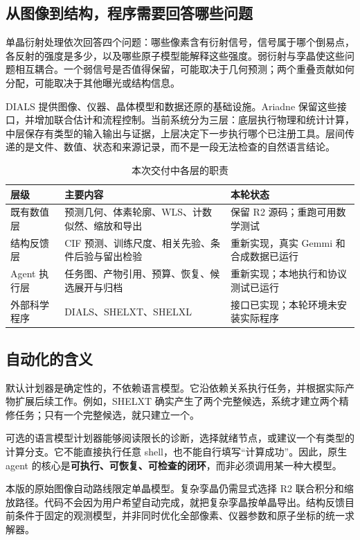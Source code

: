 \documentclass[UTF8,11pt,a4paper,fontset=fandol]{ctexart}
\begin{document}
\subsection{从图像到结构，程序需要回答哪些问题}

单晶衍射处理依次回答四个问题：哪些像素含有衍射信号，信号属于哪个倒易点，各反射的强度是多少，以及哪些原子模型能解释这些强度。弱衍射与孪晶使这些问题相互耦合。一个弱信号是否值得保留，可能取决于几何预测；两个重叠贡献如何分配，可能取决于其他曝光或结构信息。

DIALS 提供图像、仪器、晶体模型和数据还原的基础设施\cite{dials,geometry}。Ariadne 保留这些接口，并增加联合估计和流程控制。当前系统分为三层：底层执行物理和统计计算，中层保存有类型的输入输出与证据，上层决定下一步执行哪个已注册工具。层间传递的是文件、数值、状态和来源记录，而不是一段无法检查的自然语言结论。

\begin{table}[htbp]
\centering\caption{本次交付中各层的职责}
\begin{tabularx}{\textwidth}{@{}p{25mm}YY@{}}
\toprule
层级 & 主要内容 & 本轮状态\\\midrule
既有数值层 & 预测几何、体素轮廓、WLS、计数似然、缩放和导出 & 保留 R2 源码；重跑可用数学测试\\
结构反馈层 & CIF 预测、训练尺度、相关先验、条件后验与留出检验 & 重新实现，真实 Gemmi 和合成数据已运行\\
Agent 执行层 & 任务图、产物引用、预算、恢复、候选展开与归档 & 重新实现；本地执行和协议测试已运行\\
外部科学程序 & DIALS、SHELXT、SHELXL & 接口已实现；本轮环境未安装实际程序\\
\bottomrule
\end{tabularx}
\end{table}

\subsection{自动化的含义}

默认计划器是确定性的，不依赖语言模型。它沿依赖关系执行任务，并根据实际产物扩展后续工作。例如，SHELXT 确实产生了两个完整候选，系统才建立两个精修任务；只有一个完整候选，就只建立一个。

可选的语言模型计划器能够阅读限长的诊断，选择就绪节点，或建议一个有类型的计算分支。它不能直接执行任意 shell，也不能自行填写“计算成功”。因此，原生 agent 的核心是\textbf{可执行、可恢复、可检查的闭环}，而非必须调用某一种大模型。

本版的原始图像自动路线限定单晶模型。复杂孪晶仍需显式选择 R2 联合积分和缩放路径。代码不会因为用户希望自动完成，就把复杂孪晶按单晶导出。结构反馈目前条件于固定的观测模型，并非同时优化全部像素、仪器参数和原子坐标的统一求解器。
\end{document}
